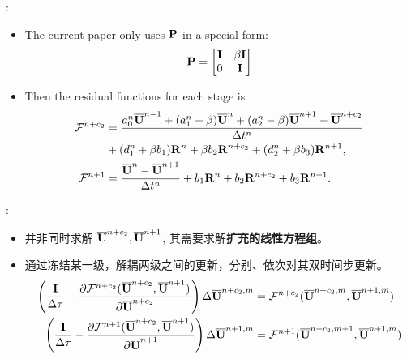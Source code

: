 \documentclass[aspectratio=169,serif]{beamer} %
\begin{document}
\begin{frame}{\secname: \subsecname}
  \begin{itemize}
    \item The current paper only uses $\mathbf{P}$ in a special form:
          \begin{equation}
            \mathbf{P} = \begin{bmatrix}
              \mathbf{I} & \beta\mathbf{I} \\
              0    & \mathbf{I}
            \end{bmatrix}
            \label{eq:specialP}
          \end{equation}
    \item Then the residual functions for each stage is
          \begin{equation}
            \begin{aligned}
              \mathcal{F}^{n+c_2} & =
              \frac{a^n_0\overline{\mathbf{U}}^{n - 1} +
                (a^n_1+\beta)\overline{\mathbf{U}}^{n} +
                (a^n_2-\beta)\overline{\mathbf{U}}^{n + 1} - \overline{\mathbf{U}}^{n+c_2}}{{\Delta} t^n}
              \\ & +
              (d^n_1 + \beta b_1)\mathbf{R}^{n} +
              \beta b_2 \mathbf{R}^{n+c_2} +
              (d^n_2 + \beta b_3)\mathbf{R}^{n + 1},                             \\
              \mathcal{F}^{n+1}   & =    \frac{\overline{\mathbf{U}}^{n} - \overline{\mathbf{U}}^{n+1}}{{\Delta} t^n}  +
              b_1 \mathbf{R}^n +
              b_2 \mathbf{R}^{n+c_2} +
              b_3 \mathbf{R}^{n+1}.
            \end{aligned}
          \end{equation}
  \end{itemize}
\end{frame}

\begin{frame}{\secname: \subsecname}
  \begin{itemize}
    \item 并非同时求解 $\overline{\mathbf{U}}^{n+c_2}, \overline{\mathbf{U}}^{n+1}$,
          其需要求解{\bf 扩充的线性方程组}。
    \item 通过冻结某一级，解耦两级之间的更新，分别、依次对其双时间步更新。
          \begin{equation}
            \begin{aligned}
              \left(\frac{\eye}{\inc\tau} -
              \partialderivative{\FF^{n+c_2}(\uu^{n+c_2}, \uu^{n+1})}{\uu^{n+c_2}}  \right)
              \inc\uu^{n+c_2,m} & = \FF^{n+c_2}(\uu^{n+c_2,m}, \uu^{n+1,m}) \\
              \left(\frac{\eye}{\inc\tau} -
              \partialderivative{\FF^{n+1}(\uu^{n+c_2}, \uu^{n+1})}{\uu^{n+1}}  \right)
              \inc\uu^{n+1,m}   & = \FF^{n+1}(\uu^{n+c_2,m+1}, \uu^{n+1,m}) \\
            \end{aligned}
            \label{eq:DITRSDS}
          \end{equation}
  \end{itemize}
\end{frame}
\end{document}
